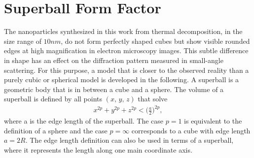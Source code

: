 \documentclass[\main/dresen_thesis.tex]{subfiles}
\begin{document}
  \section{Superball Form Factor}\label{ch:appendix:numericalMethods:superballFormfactor}
    The nanoparticles synthesized in this work from thermal decomposition, in the size range of $10 \unit{nm}$, do not form perfectly shaped cubes but show visible rounded edges at high magnification in electron microscopy images.
    This subtle difference in shape has an effect on the diffraction pattern measured in small-angle scattering.
    For this purpose, a model that is closer to the observed reality than a purely cubic or spherical model is developed in the following.
    A superball is a geometric body that is in between a cube and a sphere.
    The volume of a superball is defined by all points $(x,\, y,\, z)$ that solve
    \begin{align}
      x^{2p} + y^{2p} + z^{2p} < \biggl( \frac{a}{2} \biggr)^{2p},
    \end{align}
    where a is the edge length of the superball.
    The case $p=1$ is equivalent to the definition of a sphere and the case $p=\infty$ corresponds to a cube with edge length $a=2R$.
    The edge length definition can also be used in terms of a superball, where it represents the length along one main coordinate axis.
\end{document}
